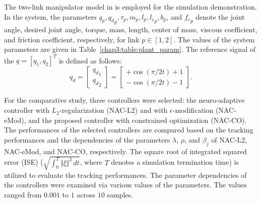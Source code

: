 The two-link manipulator model in \cite{RN33} is employed for the simulation demonstration.
In the system, the parameters $q_p,{q_d}_p,\tau_p,m_p,l_p,{l_c}_p,b_p$, and ${f_c}_p$ denote the joint angle, desired joint angle, torque, mass, length, center of mass, viscous coefficient, and friction coefficient, respectively, for link $p\in[1,2]$.
The values of the system parameters are given in Table~\ref{chap3:table:plant_param}.
The reference signal of the $q=[q_1,q_2]^T$ is defined as follows:
\begin{equation}
    q_d
    =
    \begin{bmatrix}
        {q_d}_1\\
        {q_d}_2
    \end{bmatrix}
    = 
    \begin{bmatrix}
        +\cos(\pi/2 t) + 1 \\
        -\cos(\pi/2 t) - 1 
    \end{bmatrix}
    .
\end{equation}

For the comparative study, three controllers were selected: the neuro-adaptive controller with $L_2$-regularization (NAC-L2) and with $\epsilon$-modification (NAC-eMod), and the proposed controller with constrained optimization (NAC-CO).
The performances of the selected controllers are compared based on the tracking performances and the dependencies of the parameters $\lambda$, $\rho$, and $\beta_j$ of NAC-L2, NAC-eMod, and NAC-CO, respectively.
The square root of integrated squared error (ISE) (\ie $\sqrt{\int_0^T\Vert\xi\Vert^2\,dt}$, where $T$ denotes a simulation termination time) is utilized to evaluate the tracking performances.
The parameter dependencies of the controllers were examined via various values of the parameters. 
The values ranged from $0.001$ to $1$ across $10$ samples.

